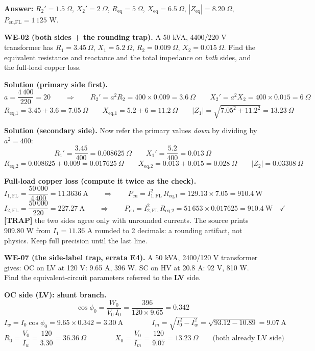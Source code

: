 \documentclass[11pt]{article}
\newcommand{\tagline}[1]{\textbf{\color{copper}#1}}
\newcommand{\trap}[1]{\vspace{2pt}\textbf{\color{red}[TRAP]} #1}
\begin{document}
\textbf{Answer:} $R_2' = 1.5\ \Omega$, $X_2' = 2\ \Omega$, $R_{\text{eq}} = 5\ \Omega$, $X_{\text{eq}} = 6.5\ \Omega$, $|Z_{\text{eq}}| = 8.20\ \Omega$, $P_{\text{cu,FL}} = 1\,125$ W.

\vspace{2pt}

\tagline{WE-02 (both sides + the rounding trap).} A 50 kVA, 4400/220 V transformer has $R_1 = 3.45\ \Omega$, $X_1 = 5.2\ \Omega$, $R_2 = 0.009\ \Omega$, $X_2 = 0.015\ \Omega$. Find the equivalent resistance and reactance and the total impedance on \emph{both} sides, and the full-load copper loss.

\textbf{Solution (primary side first).}
\[
a = \frac{4\,400}{220} = 20
\qquad\Longrightarrow\qquad
R_2' = a^{2} R_2 = 400 \times 0.009 = 3.6\ \Omega
\qquad
X_2' = a^{2} X_2 = 400 \times 0.015 = 6\ \Omega
\]
\[
R_{\text{eq,1}} = 3.45 + 3.6 = 7.05\ \Omega
\qquad
X_{\text{eq,1}} = 5.2 + 6 = 11.2\ \Omega
\qquad
|Z_1| = \sqrt{7.05^{2} + 11.2^{2}} = 13.23\ \Omega
\]

\textbf{Solution (secondary side).} Now refer the primary values \emph{down} by dividing by $a^{2} = 400$:
\[
R_1' = \frac{3.45}{400} = 0.008625\ \Omega
\qquad
X_1' = \frac{5.2}{400} = 0.013\ \Omega
\]
\[
R_{\text{eq,2}} = 0.008625 + 0.009 = 0.017625\ \Omega
\qquad
X_{\text{eq,2}} = 0.013 + 0.015 = 0.028\ \Omega
\qquad
|Z_2| = 0.03308\ \Omega
\]

\textbf{Full-load copper loss (compute it twice as the check).}
\[
I_{1,\text{FL}} = \frac{50\,000}{4\,400} = 11.3636\ \text{A}
\qquad\Longrightarrow\qquad
P_{\text{cu}} = I_{1,\text{FL}}^{2}\, R_{\text{eq,1}} = 129.13 \times 7.05 = 910.4\ \text{W}
\]
\[
I_{2,\text{FL}} = \frac{50\,000}{220} = 227.27\ \text{A}
\qquad\Longrightarrow\qquad
P_{\text{cu}} = I_{2,\text{FL}}^{2}\, R_{\text{eq,2}} = 51\,653 \times 0.017625 = 910.4\ \text{W}
\quad\checkmark
\]
\trap{the two sides agree only with unrounded currents. The source prints 909.80 W from $I_1 = 11.36$ A rounded to 2 decimals: a rounding artifact, not physics. Keep full precision until the last line.}

\vspace{2pt}

\tagline{WE-07 (the side-label trap, errata E4).} A 50 kVA, 2400/120 V transformer gives: OC on LV at 120 V: 9.65 A, 396 W. SC on HV at 20.8 A: 92 V, 810 W. Find the equivalent-circuit parameters referred to the \textbf{LV} side.

\textbf{OC side (LV): shunt branch.}
\[
\cos\phi_0 = \frac{W_0}{V_0\, I_0} = \frac{396}{120 \times 9.65} = 0.342
\]
\[
I_w = I_0 \cos\phi_0 = 9.65 \times 0.342 = 3.30\ \text{A}
\qquad\qquad
I_m = \sqrt{I_0^{2} - I_w^{2}} = \sqrt{93.12 - 10.89} = 9.07\ \text{A}
\]
\[
R_0 = \frac{V_0}{I_w} = \frac{120}{3.30} = 36.36\ \Omega
\qquad\qquad
X_0 = \frac{V_0}{I_m} = \frac{120}{9.07} = 13.23\ \Omega
\qquad\text{(both already LV side)}
\]
\end{document}
